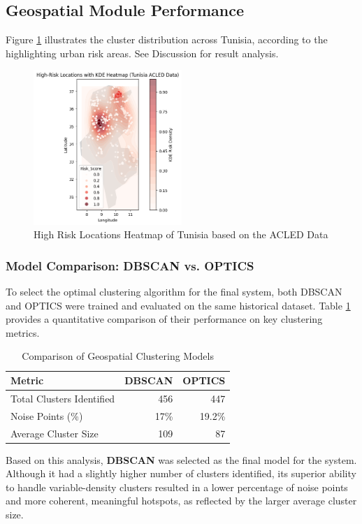 \documentclass[12pt,a4paper,oneside,english]{book}
\begin{document}
    \subsection{Geospatial Module Performance}
    \label{subsec:geo_results}

Figure \ref{fig:Clusters_heatmap} illustrates the cluster distribution across Tunisia, according to the highlighting urban risk areas. See Discussion for result analysis.
\begin{figure}[h!] %
    \centering
    \includegraphics[width=0.5\textwidth]{images/high_risk_locations_heatmap_tunisia_acled_data.png}
    \caption{High Risk Locations Heatmap of Tunisia based on the ACLED Data}
    \label{fig:Clusters_heatmap}
\end{figure}

    \subsubsection{Model Comparison: DBSCAN vs. OPTICS}
    \label{subsubsec:geo_model_comparison}
    To select the optimal clustering algorithm for the final system, both DBSCAN and OPTICS were trained and evaluated on the same historical dataset. Table \ref{tab:geo_model_comparison} provides a quantitative comparison of their performance on key clustering metrics.
    
    \begin{table}[h!]
        \centering
        \caption{Comparison of Geospatial Clustering Models}
        \label{tab:geo_model_comparison}
        \begin{tabular}{lrr}
            \hline
            \textbf{Metric} & \textbf{DBSCAN} & \textbf{OPTICS} \\ \hline
            Total Clusters Identified & 456 & 447 \\
            Noise Points (\%) & 17\% & 19.2\% \\
            Average Cluster Size & 109 & 87 \\
        \end{tabular}
    \end{table}
    Based on this analysis, \textbf{DBSCAN} was selected as the final model for the system. Although it had a slightly higher number of clusters identified, 
    its superior ability to handle 
    variable-density clusters resulted in a lower percentage of noise points and more coherent, meaningful hotspots, as reflected by the larger average cluster size.
\end{document}
